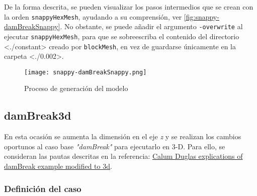 De la forma descrita, se pueden visualizar los pasos intermedios que se
crean con la orden \texttt{snappyHexMesh}, ayudando a su comprensión, ver \autoref{fig:snappy-damBreakSnappy}. No
obstante, se puede añadir el argumento \texttt{-overwrite} al ejecutar
\texttt{snappyHexMesh}, para que se sobreescriba el contenido del
directorio \textless{}./constant\textgreater{} creado por
\texttt{blockMesh}, en vez de guardarse únicamente en la carpeta
\textless{}./0.002\textgreater{}.

\begin{figure}
\centering
\texttt{[image: snappy-damBreakSnappy.png]}
\caption{Proceso de generación del modelo}
\label{fig:snappy-damBreakSnappy}
\end{figure}

\subsection{damBreak3d}\label{header-n982}

En esta ocasión se aumenta la dimensión en el eje \emph{z} y se realizan
los cambios oportunos al caso base \emph{"damBreak"} para ejecutarlo en
3-D. Para ello, se consideran las pautas descritas en la referencia:
\href{http://www.calumdouglas.ch/openfoam-example-3d-dambreak/}{Calum
Duglas explications of damBreak example modified to 3d}.

\subsubsection{Definición del caso}\label{header-n987}

